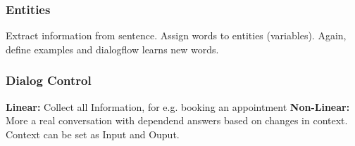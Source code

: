 \subsubsection{Entities}
Extract information from sentence.
Assign words to entities (variables).
Again, define examples and dialogflow learns new words.

\subsubsection{Dialog Control}
\textbf{Linear:} Collect all Information, for e.g. booking an appointment
\textbf{Non-Linear:} More a real conversation with dependend answers based on changes in context.
Context can be set as Input and Ouput.